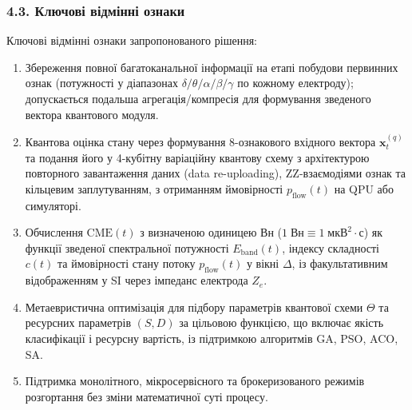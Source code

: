 \documentclass[12pt,a4paper]{article}
\begin{document}
\subsubsection{4.3. Ключові відмінні ознаки}\label{ux43aux43bux44eux447ux43eux432ux456-ux432ux456ux434ux43cux456ux43dux43dux456-ux43eux437ux43dux430ux43aux438}



Ключові відмінні ознаки запропонованого рішення:



\begin{enumerate}

\def\labelenumi{\arabic{enumi}.}

\item

  Збереження повної багатоканальної інформації на етапі побудови первинних ознак (потужності у діапазонах \(\delta/\theta/\alpha/\beta/\gamma\) по кожному електроду); допускається подальша агрегація/компресія для формування зведеного вектора квантового модуля.

\item

  Квантова оцінка стану через формування 8-ознакового вхідного вектора \(\mathbf{x}_t^{(q)}\) та подання його у 4-кубітну варіаційну квантову схему з архітектурою повторного завантаження даних (data re-uploading), ZZ-взаємодіями ознак та кільцевим заплутуванням, з отриманням ймовірності \(p_{\text{flow}}(t)\) на QPU або симуляторі.

\item

  Обчислення \(\text{CME}(t)\) з визначеною одиницею Вн (\(1\;\text{Вн} \equiv 1\;\text{мкВ}^2 \cdot \text{с}\)) як функції зведеної спектральної потужності \(E_{\text{band}}(t)\), індексу складності \(c(t)\) та ймовірності стану потоку \(p_{\text{flow}}(t)\) у вікні \(\Delta\), із факультативним відображенням у SI через імпеданс електрода \(Z_e\).

\item

  Метаевристична оптимізація для підбору параметрів квантової схеми \(\Theta\) та ресурсних параметрів \((S, D)\) за цільовою функцією, що включає якість класифікації і ресурсну вартість, із підтримкою алгоритмів GA, PSO, ACO, SA.

\item

  Підтримка монолітного, мікросервісного та брокеризованого режимів розгортання без зміни математичної суті процесу.


\end{enumerate}
\end{document}
